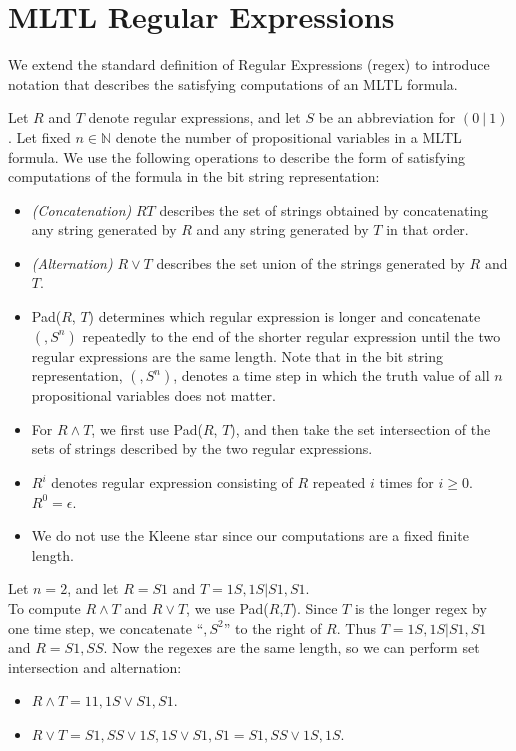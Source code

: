 \documentclass[runningheads]{llncs}
\begin{document}
\section{MLTL Regular Expressions} \label{regex}
\vspace{-0.1in}
We extend the standard definition of Regular Expressions (regex) \cite{sipser} to introduce notation that describes the satisfying computations of an MLTL formula.
\begin{definition} \label{TRE} 
Let $R$ and $T$ denote regular expressions, and let $S$ be an abbreviation for $(0 \ | \ 1)$. Let fixed $n \in \mathbb{N}$ denote the number of propositional variables in a MLTL formula. We use the following operations to describe the form of satisfying computations of the formula in the bit string representation:
\begin{itemize}
  \item \emph{(Concatenation)} $RT$ describes the set of strings obtained by concatenating any string generated by $R$ and any string generated by $T$ in that order.
 \item \emph{(Alternation)} $R \lor T$ describes the set union of the strings generated by $R$ and $T$.
    \item Pad($R$, $T$) determines which regular expression is longer and concatenate $(,S^n)$ repeatedly to the end of the shorter regular expression until the two regular expressions are the same length. Note that in the bit string representation, $(,S^n)$, denotes a time step in which the truth value of all $n$ propositional variables does not matter.
    \item For $R \land T$, we first use Pad($R$, $T$), and then take the set intersection of the sets of strings described by the two regular expressions.
      \item $R^i$ denotes regular expression consisting of $R$ repeated $i$ times for $i \geq 0$. $R^0 = \epsilon$. %
    \item We do not use the Kleene star since our computations are a fixed finite length.
\end{itemize}
\end{definition}
\begin{example} %
Let $n = 2$, and let $R = S1$ and $T = 1S,1S | S1,S1$.\\
To compute $R \land T$ and $R \lor T$, we use Pad($R$,$T$). Since $T$ is the longer regex by one time step, we concatenate ``$,S^2$'' to the right of $R$. Thus $T =1S,1S | S1,S1$ and $R = S1,SS$. Now the regexes are the same length, so we can perform set intersection and alternation:
\begin{itemize}
    \item $R \land T = 11,1S \lor S1, S1$.
    \item $R \lor T = S1,SS \lor 1S,1S \lor S1,S1 = S1,SS \lor 1S,1S$.
\end{itemize}
\end{example}
\end{document}
